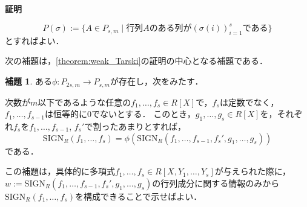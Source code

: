 \documentclass[uplatex, dvipdfmx]{jsarticle}
\makeatletter
\renewenvironment{proof}[1][\proofname]{\par
  \pushQED{\qed}%
  \normalfont \topsep6\p@\@plus6\p@\relax
  \trivlist
  \item\relax
  {\bfseries
  #1\@addpunct{.}}\hspace\labelsep\ignorespaces
}{%
  \popQED\endtrivlist\@endpefalse
}
\newcommand{\SIGN}{\mathrm{SIGN}}
\newcommand{\map}[3]{{#1}:{#2}\rightarrow{#3}}
\theoremstyle{definition}
\newtheorem{lemma}{補題}[section]
\renewcommand{\proofname}{\textbf{証明}}
\makeatother
\begin{document}
\begin{proof}
     \[
          P(\sigma):=\{A \in P_{s,m} \mid \text{行列$A$のある列が$(\sigma(i))_{i=1}^s$である}\}
     \]
     とすればよい．
\end{proof}

次の補題は，\cref{theorem:weak_Tarski}の証明の中心となる補題である．

\begin{lemma}\label{lemma:qe_lowering}
     ある$\map{\phi}{P_{2s,m}}{P_{s,m}}$が存在し，次をみたす．

     次数が$m$以下であるような任意の$f_1, \dots, f_s \in R[X]$で，$f_s$は定数でなく，$f_1, \dots, f_{s-1}$は恒等的に$0$でないとする．
     このとき，$g_1, \dots, g_s \in R[X]$を，それぞれ$f_s$を$f_1, \dots, f_{s-1}$, $f_s'$で割ったあまりとすれば，
     \[
          \SIGN_R(f_1, \dots, f_s) = \phi(\SIGN_R(f_1, \dots, f_{s-1}, f_s', g_1, \dots, g_s))
     \]
     である．
\end{lemma}

この補題は，具体的に多項式$f_1, \dots, f_s \in R[X, Y_1, \dots, Y_s]$が与えられた際に，
$w:=\SIGN_R(f_1, \dots, f_{s-1}, f_s', g_1, \dots, g_s)$の行列成分に関する情報のみから
$\SIGN_R(f_1, \dots, f_s)$を構成できることで示せばよい． 
\end{document}
